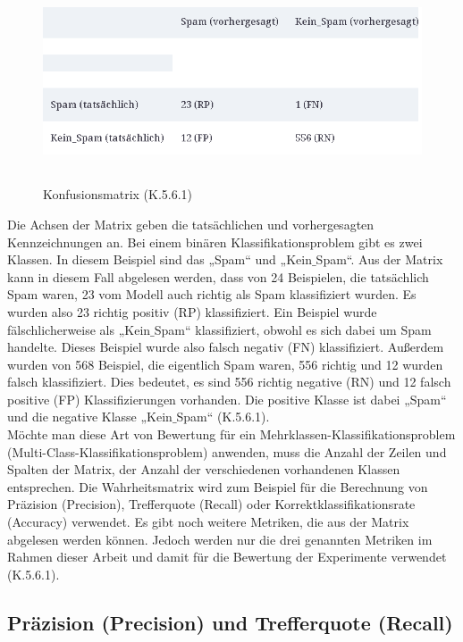 \documentclass[12pt]{scrreprt}
\begin{document}
\begin{figure}[h!]
	\centering
	\includegraphics[width=12cm,height=6cm]		{Wahrheitsmatrix.png}
	\caption{Konfusionsmatrix  \cite{Burkov2019}(K.5.6.1)}
	\label{fig:fig21}
\end{figure}

Die Achsen der Matrix geben die tatsächlichen und vorhergesagten Kennzeichnungen an. Bei einem binären Klassifikationsproblem gibt es zwei Klassen. In diesem Beispiel sind das „Spam“ und „Kein$\_$Spam“.  Aus der Matrix kann in diesem Fall abgelesen werden, dass von 24 Beispielen, die tatsächlich Spam waren, 23 vom Modell auch richtig als Spam klassifiziert wurden. Es wurden also 23 richtig positiv (RP) klassifiziert. Ein Beispiel wurde fälschlicherweise als „Kein$\_$Spam“ klassifiziert, obwohl es sich dabei um Spam handelte. Dieses Beispiel wurde also falsch negativ (FN) klassifiziert. Außerdem wurden von 568 Beispiel, die eigentlich Spam waren, 556 richtig und 12 wurden falsch klassifiziert. Dies bedeutet, es sind 556 richtig negative (RN) und 12 falsch positive (FP) Klassifizierungen vorhanden. Die positive Klasse ist dabei „Spam“ und die negative Klasse „Kein$\_$Spam“ \cite{Burkov2019} (K.5.6.1). \\

Möchte man diese Art von Bewertung für ein Mehrklassen-Klassifikationsproblem (Multi-Class-Klassifikationsproblem) anwenden, muss die Anzahl der Zeilen und Spalten der Matrix, der Anzahl der verschiedenen vorhandenen Klassen entsprechen. Die Wahrheitsmatrix wird zum Beispiel für die Berechnung von Präzision (Precision), Trefferquote (Recall) oder Korrektklassifikationsrate (Accuracy) verwendet. Es gibt noch weitere Metriken, die aus der Matrix abgelesen werden können. Jedoch werden nur die drei genannten Metriken im Rahmen dieser Arbeit und damit für die Bewertung der Experimente verwendet \cite{Burkov2019} (K.5.6.1).  

\subsection{Präzision (Precision) und Trefferquote (Recall)} 
\end{document}
